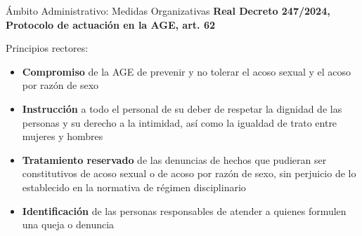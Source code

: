 \documentclass{beamer}
\begin{document}
    \begin{frame}{Ámbito Administrativo: Medidas Organizativas}
        \textbf{Real Decreto 247/2024, Protocolo de actuación en la AGE, art. 62}

        Principios rectores:
        \begin{itemize}
            \item \textbf{Compromiso} de la AGE de prevenir y no tolerar el acoso sexual y el acoso por razón de sexo
            \item \textbf{Instrucción} a todo el personal de su deber de respetar la dignidad de las personas y su derecho a la intimidad, así como la igualdad de trato entre mujeres y hombres
            \item \textbf{Tratamiento reservado} de las denuncias de hechos que pudieran ser constitutivos de acoso sexual o de acoso por razón de sexo, sin perjuicio de lo establecido en la normativa de régimen disciplinario
            \item \textbf{Identificación} de las personas responsables de atender a quienes formulen una queja o denuncia
        \end{itemize}
    \end{frame}
\end{document}
